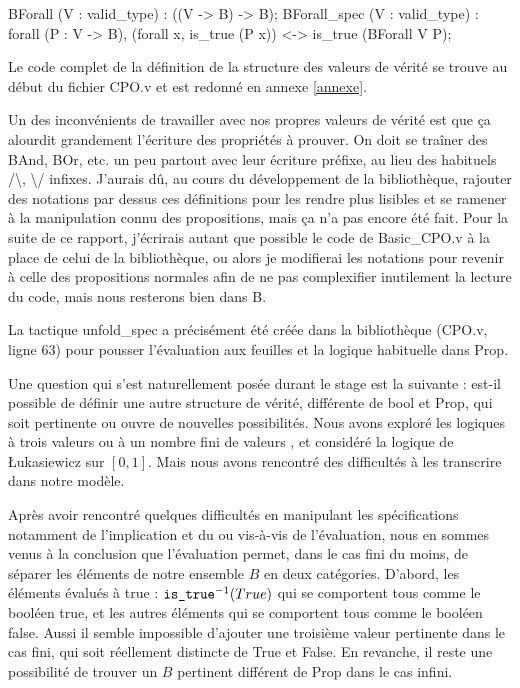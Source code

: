 \documentclass{article}
\newcommand\code[1]{{\fontfamily{lmtt}\selectfont #1}}
\theoremstyle{definition}
\begin{document}
\begin{coq}
  BForall (V : valid_type) : ((V -> B) -> B);
  BForall_spec (V : valid_type) : forall (P : V -> B),
    (forall x, is_true (P x)) <-> is_true (BForall V P);
\end{coq}

Le code complet de la définition de la structure des valeurs de vérité se trouve au début du fichier \code{CPO.v} et est redonné en annexe \ref{annexe}.

\medskip

Un des inconvénients de travailler avec nos propres valeurs de vérité est que ça alourdit grandement l'écriture des propriétés à prouver. On doit se traîner des \code{BAnd}, \code{BOr}, etc. un peu partout avec leur écriture préfixe, au lieu des habituels /\textbackslash, \textbackslash / infixes. J'aurais dû, au cours du développement de la bibliothèque, rajouter des notations par dessus ces définitions pour les rendre plus lisibles et se ramener à la manipulation connu des propositions, mais ça n'a pas encore été fait. Pour la suite de ce rapport, j'écrirais autant que possible le code de \code{Basic\_CPO.v} à la place de celui de la bibliothèque, ou alors je modifierai les notations pour revenir à celle des propositions normales afin de ne pas complexifier inutilement la lecture du code, mais nous resterons bien dans B.

La tactique \code{unfold\_spec} a précisément été créée dans la bibliothèque (\code{CPO.v}, ligne 63) pour pousser l'évaluation aux feuilles et la logique habituelle dans \code{Prop}.


\bigskip

Une question qui s'est naturellement posée durant le stage est la suivante : est-il possible de définir une autre structure de vérité, différente de \code{bool} et \code{Prop}, qui soit pertinente ou ouvre de nouvelles possibilités. Nous avons exploré les logiques à trois valeurs ou à un nombre fini de valeurs \cite{manylogic}, et considéré la logique de Łukasiewicz sur $[0,1]$. Mais nous avons rencontré des difficultés à les transcrire dans notre modèle.

Après avoir rencontré quelques difficultés en manipulant les spécifications notamment de l'implication et du \og ou\fg{} vis-à-vis de l'évaluation, nous en sommes venus à la conclusion que l'évaluation permet, dans le cas fini du moins, de séparer les éléments de notre ensemble $B$ en deux catégories. D'abord, les éléments évalués à true : $\text{\code{is\_true}}^{-1}(True)$ qui se comportent tous comme le booléen \code{true}, et les autres éléments qui se comportent tous comme le booléen \code{false}. Aussi il semble impossible d'ajouter une troisième valeur pertinente dans le cas fini, qui soit réellement distincte de True et False. En revanche, il reste une possibilité de trouver un $B$ pertinent différent de Prop dans le cas infini.
\end{document}
